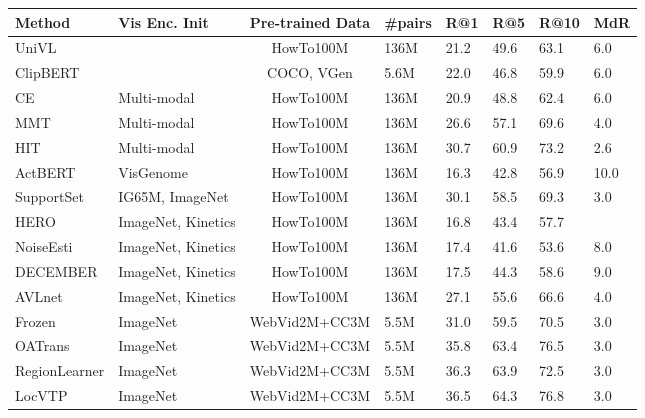 \documentclass[10pt,twocolumn,letterpaper]{article}
\begin{document}
\begin{table*}[t]
\centering
\begin{tabular}{llclllll}
	\toprule
	Method          & Vis Enc. Init      & Pre-trained Data & \#pairs & R@1  & R@5  & R@10 & MdR \\
	\midrule
	UniVL \cite{luo2020univl}           & \text { - }                  & HowTo100M        & 136M    & 21.2 & 49.6 & 63.1 & 6.0   \\
	ClipBERT \cite{lei2021less}       & \text { - }                  & COCO, VGen       & 5.6M    & 22.0   & 46.8 & 59.9 & 6.0   \\
	CE \cite{liu2019use}              & Multi-modal        & HowTo100M        & 136M    & 20.9 & 48.8 & 62.4 & 6.0   \\
	MMT \cite{gabeur2020multi}            & Multi-modal        & HowTo100M        & 136M    & 26.6 & 57.1 & 69.6 & 4.0   \\
	HIT \cite{liu2021hit}            & Multi-modal        & HowTo100M        & 136M    & 30.7 & 60.9 & 73.2 & 2.6 \\
	ActBERT \cite{zhu2020actbert}         & VisGenome          & HowTo100M        & 136M    & 16.3 & 42.8 & 56.9 & 10.0  \\
	SupportSet \cite{patrick2020support}     & IG65M, ImageNet    & HowTo100M        & 136M    & 30.1 & 58.5 & 69.3 & 3.0   \\
	HERO \cite{li2020hero}           & ImageNet, Kinetics & HowTo100M        & 136M    & 16.8 & 43.4 & 57.7 & \text { - }   \\
	NoiseEsti \cite{amrani2021noise} & ImageNet, Kinetics & HowTo100M        & 136M    & 17.4 & 41.6 & 53.6 & 8.0   \\
	DECEMBER \cite{tang2021decembert}       & ImageNet, Kinetics & HowTo100M        & 136M    & 17.5 & 44.3 & 58.6& 9.0 \\
	AVLnet \cite{rouditchenko2020avlnet}         & ImageNet, Kinetics & HowTo100M        & 136M    & 27.1 & 55.6 & 66.6 & 4.0   \\
	Frozen \cite{bain2021frozen}          & ImageNet           & WebVid2M+CC3M    & 5.5M    & 31.0   & 59.5 & 70.5 & 3.0   \\
	OATrans \cite{wang2022object}       & ImageNet           & WebVid2M+CC3M    & 5.5M    & 35.8 & 63.4 & 76.5 & 3.0   \\
	RegionLearner \cite{yan2021video}   & ImageNet           & WebVid2M+CC3M    & 5.5M    & 36.3 & 63.9 & 72.5 & 3.0   \\
	LocVTP \cite{cao2022locvtp}          & ImageNet           & WebVid2M+CC3M    & 5.5M    & 36.5 & 64.3 & 76.8 & 3.0   \\
	

\end{tabular}
\end{table*}
\end{document}
